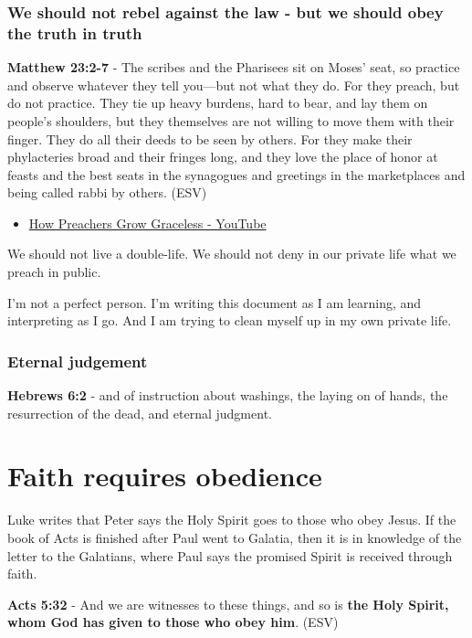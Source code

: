 \documentclass[11pt]{article}
\begin{document}
\subsubsection{We should not rebel against the law - but we should obey the truth in truth}
\label{sec:org403d330}
\textbf{Matthew 23:2-7} - The scribes and the Pharisees sit on Moses' seat, so practice and observe whatever they tell you—but not what they do. For they preach, but do not practice. They tie up heavy burdens, hard to bear, and lay them on people's shoulders, but they themselves are not willing to move them with their finger. They do all their deeds to be seen by others. For they make their phylacteries broad and their fringes long, and they love the place of honor at feasts and the best seats in the synagogues and greetings in the marketplaces and being called rabbi by others. (ESV)

\begin{itemize}
\item \href{https://www.youtube.com/watch?v=alOI2zxIPgc}{How Preachers Grow Graceless - YouTube}
\end{itemize}

We should not live a double-life.
We should not deny in our private life what we preach in public.

I'm not a perfect person. I'm writing this document as I am learning, and interpreting as I go.
And I am trying to clean myself up in my own private life.

\subsubsection{Eternal judgement}
\label{sec:org44db904}
\textbf{Hebrews 6:2} - and of instruction about washings, the laying on of hands, the resurrection of the dead, and eternal judgment.

\section{Faith requires obedience}
\label{sec:orgbb6dcdf}
Luke writes that Peter says the Holy Spirit goes to those who obey Jesus.
If the book of Acts is finished after Paul went to Galatia, then it is in knowledge of the letter to the Galatians, where Paul says the promised Spirit is received through faith.

\textbf{Acts 5:32} - And we are witnesses to these things, and so is \textbf{the Holy Spirit, whom God has given to those who obey him}. (ESV)
\end{document}
